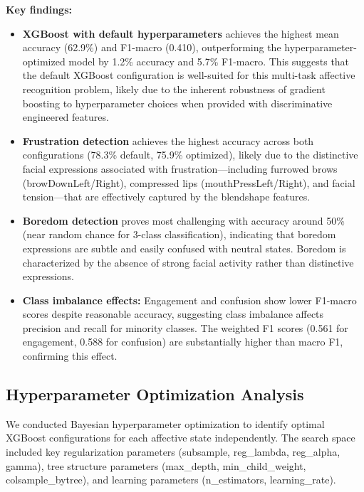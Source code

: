 \textbf{Key findings:}
\begin{itemize}
    \item \textbf{XGBoost with default hyperparameters} achieves the highest mean accuracy (62.9\%) and F1-macro (0.410), outperforming the hyperparameter-optimized model by 1.2\% accuracy and 5.7\% F1-macro. This suggests that the default XGBoost configuration is well-suited for this multi-task affective recognition problem, likely due to the inherent robustness of gradient boosting to hyperparameter choices when provided with discriminative engineered features.

    \item \textbf{Frustration detection} achieves the highest accuracy across both configurations (78.3\% default, 75.9\% optimized), likely due to the distinctive facial expressions associated with frustration---including furrowed brows (browDownLeft/Right), compressed lips (mouthPressLeft/Right), and facial tension---that are effectively captured by the blendshape features.

    \item \textbf{Boredom detection} proves most challenging with accuracy around 50\% (near random chance for 3-class classification), indicating that boredom expressions are subtle and easily confused with neutral states. Boredom is characterized by the absence of strong facial activity rather than distinctive expressions.

    \item \textbf{Class imbalance effects:} Engagement and confusion show lower F1-macro scores despite reasonable accuracy, suggesting class imbalance affects precision and recall for minority classes. The weighted F1 scores (0.561 for engagement, 0.588 for confusion) are substantially higher than macro F1, confirming this effect.
\end{itemize}

\subsection{Hyperparameter Optimization Analysis}
\label{sec:hyperparameter-optimization}

We conducted Bayesian hyperparameter optimization to identify optimal XGBoost configurations for each affective state independently. The search space included key regularization parameters (subsample, reg\_lambda, reg\_alpha, gamma), tree structure parameters (max\_depth, min\_child\_weight, colsample\_bytree), and learning parameters (n\_estimators, learning\_rate).

